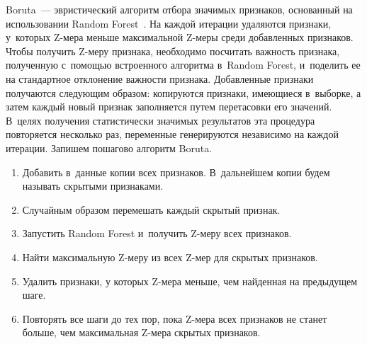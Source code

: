 \begin{multicols}{2}
  Boruta~--- эвристический алгоритм отбора значимых признаков, 
основанный на использовании Random Forest~\cite{4-sev}. На каждой 
итерации удаляются признаки, у~которых Z-ме\-ра меньше максимальной  
Z-ме\-ры среди добавленных признаков. Чтобы получить Z-ме\-ру 
признака, необходимо посчитать важность признака, полученную  
с~по\-мощью встроенного алгоритма в~Random Forest, и~поделить ее на 
стандартное отклонение важности признака. Добавленные признаки 
получаются следующим образом: копируются признаки, имеющиеся 
в~выборке, а затем каждый новый признак заполняется путем перетасовки 
его значений. В~целях получения статистически значимых результатов эта 
процедура повторяется несколько раз, переменные генерируются независимо 
на каждой итерации. Запишем пошагово алгоритм Boruta.
  \begin{enumerate}[1.]
  \item Добавить в~данные копии всех признаков. В~дальнейшем копии 
будем называть скрытыми признаками.
  \item Случайным образом перемешать каждый скрытый признак. 
   \item Запустить Random Forest и~получить Z-ме\-ру всех признаков.
  \item Найти максимальную Z-ме\-ру из всех Z-мер для скрытых 
признаков.
  \item Удалить признаки, у которых Z-ме\-ра меньше, чем найденная на 
предыдущем шаге. 
  \item Повторять все шаги до тех пор, пока Z-ме\-ра всех признаков не 
станет больше, чем максимальная Z-ме\-ра скрытых признаков.
  \end{enumerate}
  
   \begin{table*}\small %
  \begin{center}
  \vspace*{2ex}
  

\end{center}
\end{table*}
\end{multicols}
